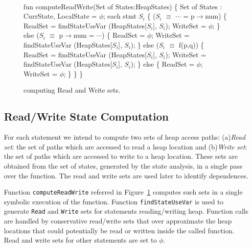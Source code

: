 \begin{figure}
\begin{framed}
{\tt
  \begin{program}{0}
  \FL fun computeReadWrite(Set of States:HeapStates)  \{
   Set of States : CurrState, LocalState = $\phi$;
   \FOR each stmt $S_i$ \{
   \IF ($S_i$ $\equiv$ $\cdots$ = p$\rightarrow$num) \{ 
   ReadSet = findStateUseVar (HeapStates[$S_i$], $S_i$);
   WriteSet = $\phi$;
   \}
   \IF else ($S_i$ $\equiv$ p$\rightarrow$num = $\cdots$) \{ 
   ReadSet = $\phi$;
   WriteSet = findStateUseVar (HeapStates[$S_i$], $S_i$);
   \}
   \IF else ($S_i$ $\equiv$ f(p,q)) \{ 
   ReadSet = findStateUseVar (HeapStates[$S_i$], $S_i$);
   WriteSet = findStateUseVar (HeapStates[$S_i$], $S_i$);
   \}
   else \{
   ReadSet = $\phi$;
   WriteSet = $\phi$;
   \}
   \}
   \}
  \end{program}
}
\end{framed}
  \caption{computing Read and Write sets. \label{fig:AlgoReadWrite}}
\end{figure}
\subsection{Read/Write State Computation}
For each statement we intend to compute two sets of heap access 
paths: (a)\emph{Read set}: the set of paths which are accessed 
to read a heap location and (b)\emph{Write set}: the set of paths 
which are accessed to write to a heap location. These sets are 
obtained from the set of states, generated by the state analysis, in a single 
pass over the function. The read and write sets are used 
later to identify dependences. 

Function {\tt computeReadWrite} 
referred in Figure~\ref{fig:AlgoReadWrite} computes such sets in a 
single symbolic execution of the function. 
Function {\tt findStateUseVar} is used to generate {\tt Read} 
and {\tt Write} sets for statements reading/writing heap. Function calls are handled by
conservative read/write sets that over approximate the
heap locations that could potentially be read or written
inside the called function. Read and write sets for other statements are set to $\phi$. 

